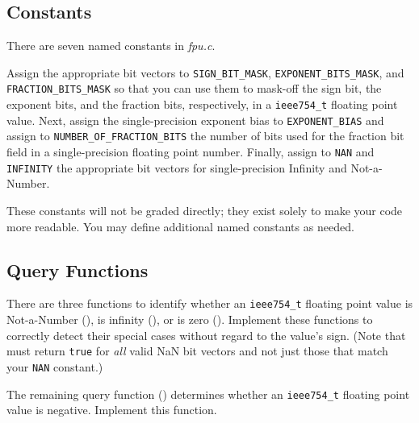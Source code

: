 \subsection{Constants}

There are seven named constants in \textit{fpu.c}.

Assign the appropriate bit vectors to \lstinline{SIGN_BIT_MASK}, \lstinline{EXPONENT_BITS_MASK}, and \lstinline{FRACTION_BITS_MASK} so that you can use them to mask-off the sign bit, the exponent bits, and the fraction bits, respectively, in a \lstinline{ieee754_t} floating point value.
Next, assign the single-precision exponent bias to \lstinline{EXPONENT_BIAS} and assign to \lstinline{NUMBER_OF_FRACTION_BITS} the number of bits used for the fraction bit field in a single-precision floating point number.
Finally, assign to \lstinline{NAN} and \lstinline{INFINITY} the appropriate bit vectors for single-precision Infinity and Not-a-Number.

These constants will not be graded directly;
they exist solely to make your code more readable.
You may define additional named constants as needed.

\subsection{Query Functions}

There are three functions to identify whether an \lstinline{ieee754_t} floating point value is Not-a-Number (), is infinity (), or is zero ().
Implement these functions to correctly detect their special cases without regard to the value's sign.
(Note that  must return \lstinline{true} for \textit{all} valid NaN bit vectors and not just those that match your \lstinline{NAN} constant.)

The remaining query function () determines whether an \lstinline{ieee754_t} floating point value is negative.
Implement this function.
